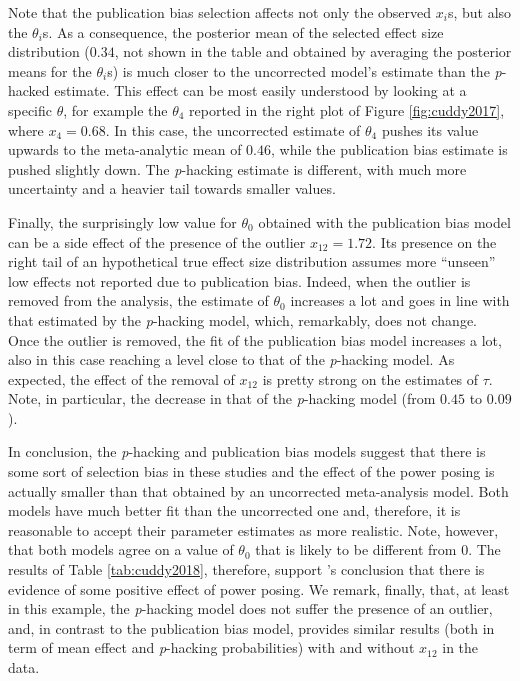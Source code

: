 \documentclass{article}
\theoremstyle{plain}
\theoremstyle{definition}
\begin{document}
Note that the publication bias selection affects not only the observed $x_{i}$s, but also the $\theta_{i}$s. As a consequence, the posterior mean of the selected effect size distribution ($0.34$, not shown in the table and obtained by averaging the posterior means for the $\theta_{i}$s) is much closer to the uncorrected model's estimate than the \textit{p}-hacked estimate. This effect can be most easily understood by looking at a specific $\theta$, for example the $\theta_4$ reported in the right plot of Figure \ref{fig:cuddy2017}, where $x_{4}=0.68$. In this case, the uncorrected estimate of $\theta_{4}$ pushes its value upwards to the meta-analytic mean of $0.46$, while the publication bias estimate is pushed slightly down. The \textit{p}-hacking estimate is different, with much more uncertainty and a heavier tail towards smaller values.

Finally, the surprisingly low value for $\theta_0$ obtained with the publication bias model can be a side effect of the presence of the outlier $x_{12} = 1.72$. Its presence on the right tail of an hypothetical true effect size distribution assumes more ``unseen'' low effects not reported due to publication bias. Indeed, when the outlier is removed from the analysis, the estimate of $\theta_{0}$ increases a lot and goes in line with that estimated by the \textit{p}-hacking model, which, remarkably, does not change. Once the outlier is removed, the fit of the publication bias model increases a lot, also in this case reaching a level close to that of the \textit{p}-hacking model. As expected, the effect of the removal of $x_{12}$ is pretty strong on the estimates of $\tau$. Note, in particular, the decrease in that of the \textit{p}-hacking model (from $0.45$ to $0.09$).



In conclusion, the \textit{p}-hacking and publication bias models suggest that there is some sort of selection bias in these studies and the effect of the power posing is actually smaller than that obtained by an uncorrected meta-analysis model. Both models have much better fit than the uncorrected one and, therefore, it is reasonable to accept their parameter estimates as more realistic. Note, however, that both models agree on  a value of $\theta_{0}$ that is likely to be different from $0$. The results of Table \ref{tab:cuddy2018}, therefore, support \citet{cuddy2018p}'s conclusion that there is evidence of some positive effect of power posing. We remark, finally, that, at least in this example, the \textit{p}-hacking model does not suffer the presence of an outlier, and, in contrast to the publication bias model, provides similar results (both in term of mean effect and \textit{p}-hacking probabilities) with and without $x_{12}$ in the data.
\end{document}
